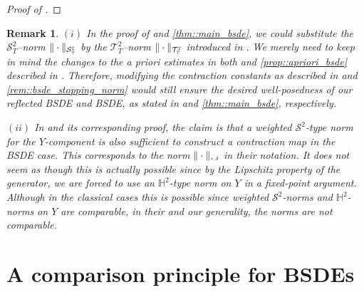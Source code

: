 \documentclass[10pt]{article} %
\newtheorem{remark}[theorem]{Remark}
\newcommand\cS{\mathcal S}
\newcommand\cT{\mathcal T}
\newcommand{\smalltext}[1]{\text{\fontsize{4}{4}\selectfont$#1$}}
\def \H{\mathbb{H}}
\newcommand{\1}{\mathbf{1}}
\begin{document}
\begin{proof}[Proof of ]
\end{proof}

\begin{remark}\label{rem::proof_main_stopping_norm}
	$(i)$ In the proof of {\rm{}} and {\rm\ref{thm::main_bsde}}, we could substitute the $\cS^2_T$--norm $\|\cdot\|_{\cS^\smalltext{2}_\smalltext{T}}$ by the $\cT^2_T$--norm $\|\cdot\|_{\cT^\smalltext{2}_\smalltext{T}}$ introduced in . We merely need to keep in mind the changes to the \emph{a priori} estimates in both {\rm{}} and {\rm\ref{prop::apriori_bsde}} described in {\rm{}}. Therefore, modifying the contraction constants as described in {\rm{}} and \ref{rem::bsde_stopping_norm} would still ensure the desired well-posedness of our reflected BSDE and BSDE, as stated in {\rm{}} and {\rm\ref{thm::main_bsde}}, respectively.

	\medskip
	$(ii)$ In {\rm\cite[Theorem 3.5]{papapantoleon2018existence}} and its corresponding proof, the claim is that a weighted $\cS^2$-type norm for the $Y$-component is also sufficient to construct a contraction map in the \emph{BSDE} case. This corresponds to the norm $\|\cdot\|_{\smalltext{\star}\smalltext{,}\smalltext{\hat\beta}}$ in their notation. It does not seem as though this is actually possible since by the Lipschitz property of the generator, we are forced to use an $\H^2$-type norm on $Y$ in a fixed-point argument. Although in the classical cases this is possible since weighted $\cS^2$-norms and $\H^2$-norms on $Y$ are comparable, in their and our generality, the norms are not comparable.	
\end{remark}

\section{A comparison principle for BSDEs}\label{sec::comparison}
\end{document}
